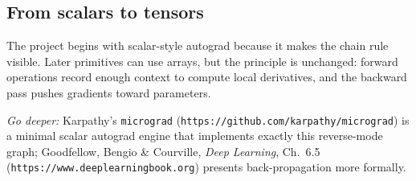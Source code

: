 \subsection*{From scalars to tensors}
The project begins with scalar-style autograd because it makes the chain rule
visible. Later primitives can use arrays, but the principle is unchanged:
forward operations record enough context to compute local derivatives, and the
backward pass pushes gradients toward parameters.

\medskip
\noindent\textit{Go deeper:} Karpathy's \texttt{micrograd}
(\texttt{https://github.com/karpathy/micrograd}) is a minimal scalar autograd
engine that implements exactly this reverse-mode graph; Goodfellow, Bengio \&
Courville, \emph{Deep Learning}, Ch.~6.5
(\texttt{https://www.deeplearningbook.org}) presents back-propagation more
formally.
